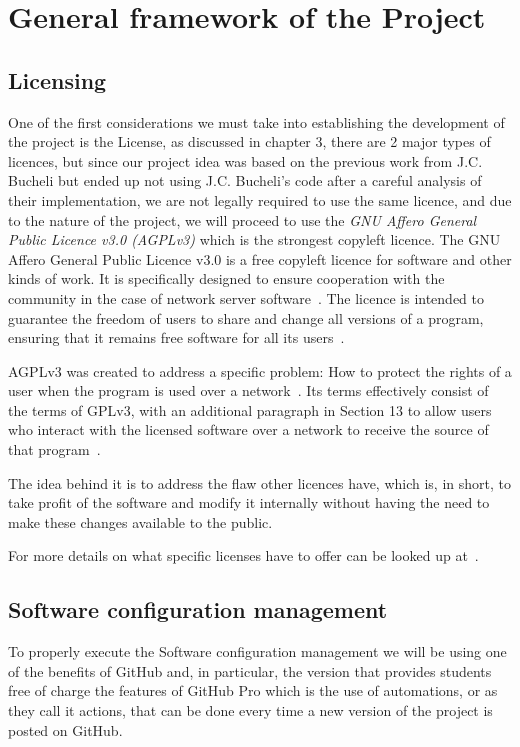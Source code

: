 
\section{General framework of the Project}

\subsection{Licensing}
One of the first considerations we must take into establishing the development of the project is the License, as discussed in chapter 3, there are 2 major types of licences, but since our project idea was based on the previous work from J.C. Bucheli but ended up not using J.C. Bucheli's code after a careful analysis of their implementation, we are not legally required to use the same licence, and due to the nature of the project, we will proceed to use the \textit{GNU Affero General Public Licence v3.0 (AGPLv3)} which is the strongest copyleft licence. The GNU Affero General Public Licence v3.0 is a free copyleft licence for software and other kinds of work. It is specifically designed to ensure cooperation with the community in the case of network server software~\cite{fsf1}. The licence is intended to guarantee the freedom of users to share and change all versions of a program, ensuring that it remains free software for all its users~\cite{fsf1}.


 AGPLv3 was created to address a specific problem: How to protect the rights of a user when the program is used over a network~\cite{fsf2}. Its terms effectively consist of the terms of GPLv3, with an additional paragraph in Section 13 to allow users who interact with the licensed software over a network to receive the source of that program~\cite{fsf3}. 


The idea behind it is to address the flaw other licences have, which is, in short, to take profit of the software and modify it internally without having the need to make these changes available to the public.


For more details on what specific licenses have to offer can be looked up at~\cite{choosealicense, opensourceorg}.

\subsection{Software configuration management}
To properly execute the Software configuration management we will be using one of the benefits of GitHub and, in particular, the version that provides students free of charge the features of GitHub Pro which is the use of automations, or as they call it actions, that can be done every time a new version of the project is posted on GitHub.

